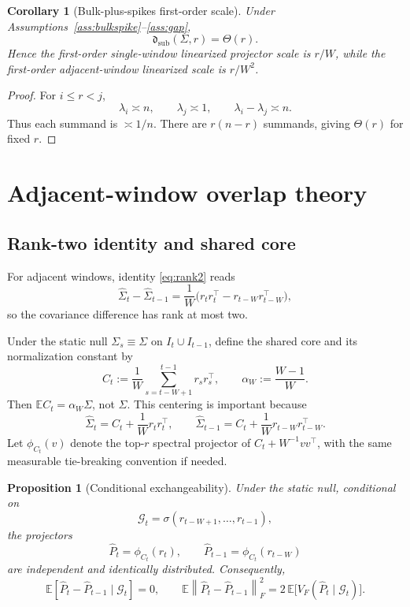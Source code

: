 \documentclass[11pt]{article}
\theoremstyle{tightplain}
\newtheorem{proposition}[theorem]{Proposition}
\newtheorem{corollary}[theorem]{Corollary}
\theoremstyle{tightdef}
\newcommand{\E}{\mathbb E}
\newcommand{\norm}[1]{\left\lVert #1 \right\rVert}
\begin{document}
\begin{corollary}[Bulk-plus-spikes first-order scale]\label{cor:firstorderscale}
Under Assumptions~\ref{ass:bulkspike}--\ref{ass:gap},
\[
\mathfrak d_{\mathrm{sub}}(\Sigma,r)=\Theta(r).
\]
Hence the first-order single-window linearized projector scale is $r/W$, while
the first-order adjacent-window linearized scale is $r/W^2$.
\end{corollary}

\begin{proof}
For $i\le r<j$,
\[
\lambda_i\asymp n,
\qquad
\lambda_j\asymp 1,
\qquad
\lambda_i-\lambda_j\asymp n.
\]
Thus each summand is $\asymp 1/n$. There are $r(n-r)$ summands, giving
$\Theta(r)$ for fixed $r$.
\end{proof}

\section{Adjacent-window overlap theory}

\subsection{Rank-two identity and shared core}

For adjacent windows, identity \eqref{eq:rank2} reads
\[
\widehat\Sigma_t-\widehat\Sigma_{t-1}
=\frac1W\bigl(r_t r_t^\top-r_{t-W}r_{t-W}^\top\bigr),
\]
so the covariance difference has rank at most two.

Under the static null $\Sigma_s\equiv\Sigma$ on $I_t\cup I_{t-1}$, define the
shared core and its normalization constant by
\[
C_t:=\frac1W\sum_{s=t-W+1}^{t-1}r_s r_s^\top,
\qquad
\alpha_W:=\frac{W-1}{W}.
\]
Then $\E C_t=\alpha_W\Sigma$, not $\Sigma$. This centering is important because
\[
\widehat\Sigma_t=C_t+\frac1W r_t r_t^\top,
\qquad
\widehat\Sigma_{t-1}=C_t+\frac1W r_{t-W}r_{t-W}^\top.
\]
Let $\phi_{C_t}(v)$ denote the top-$r$ spectral projector of $C_t+W^{-1}vv^\top$,
with the same measurable tie-breaking convention if needed.

\begin{proposition}[Conditional exchangeability]\label{prop:exchangeability}
Under the static null, conditional on
\[
\mathcal G_t=\sigma(r_{t-W+1},\dots,r_{t-1}),
\]
the projectors
\[
\widehat P_t=\phi_{C_t}(r_t),
\qquad
\widehat P_{t-1}=\phi_{C_t}(r_{t-W})
\]
are independent and identically distributed. Consequently,
\[
\E[\widehat P_t-\widehat P_{t-1}\mid\mathcal G_t]=0,
\qquad
\E\norm{\widehat P_t-\widehat P_{t-1}}_F^2
=2\,\E\bigl[V_F(\widehat P_t\mid\mathcal G_t)\bigr].
\]
\end{proposition}
\end{document}
